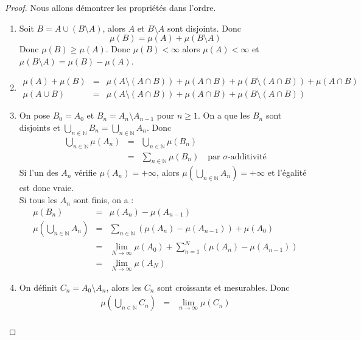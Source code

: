 \begin{proof}
	Nous allons démontrer les propriétés dans l'ordre.
	\begin{enumerate}
		\item Soit $B = A \cup (B \setminus A)$, alors $A$ et $B \setminus A$ sont disjoints. Donc
		      \[\mu(B) = \mu(A) + \mu(B \setminus A)\]
		      Donc $\mu(B) \geq \mu(A)$. Donc $\mu(B) < \infty$ alors $\mu(A)< \infty$ et $\mu(B \setminus A) = \mu(B) - \mu(A)$.
		\item \begin{eqnarray*}
			      \mu(A) + \mu (B) &=& \mu( A \setminus (A \cap B)) + \mu(A \cap B) + \mu(B \setminus (A \cap B)) + \mu(A \cap B) \\
			      \mu(A\cup B)&=& \mu(A \setminus (A \cap B)) + \mu(A \cap B) + \mu(B \setminus (A \cap B))
		      \end{eqnarray*}
		\item On pose $B_0 = A_0$ et $B_n = A_n \setminus A_{n-1}$ pour $n \geq 1$. On a que les $B_n$ sont disjoints et
		      $\bigcup\limits_{n \in \mathbb{N}} B_n = \bigcup\limits_{n \in \mathbb{N}} A_n$. Donc
		      \begin{eqnarray*}
			      \bigcup\limits_{n \in \mathbb{N}} \mu(A_n) &=& \bigcup\limits_{n \in \mathbb{N}} \mu(B_n) \\
			      &=& \sum\limits_{n \in \mathbb{N}} \mu(B_n) \quad \text{par } \sigma\text{-additivité}
		      \end{eqnarray*}
		      Si l'un des $A_n$ vérifie $\mu(A_n) = +\infty$, alors $\mu(\bigcup\limits_{n \in \mathbb{N}} A_n) = +\infty$
		      et l'égalité est donc vraie.
		      \\
		      Si tous les $A_n$ sont finis, on a :
		      \begin{eqnarray*}
			      \mu(B_n) &=& \mu(A_n) - \mu(A_{n-1}) \\
			      \mu(\bigcup\limits_{n \in \mathbb{N}} A_n) &=& \sum\limits_{n \in \mathbb{N}} \left( \mu(A_n) - \mu(A_{n-1}) \right)+ \mu(A_0) \\
			      &=& \lim\limits_{N \to \infty} \mu(A_0) + \sum\limits_{n = 1}^N \left( \mu(A_n) - \mu(A_{n-1}) \right) \\
			      &=& \lim\limits_{N \to \infty} \mu(A_N)
		      \end{eqnarray*}
		\item On définit $C_n = A_0 \setminus A_n $, alors les $C_n$ sont croissants et mesurables. Donc
		      \begin{eqnarray*}
			      \mu(\bigcup\limits_{n \in \mathbb{N}} C_n) &=& \lim\limits_{n \to \infty} \mu(C_n) \\

\end{eqnarray*}
\end{enumerate}
\end{proof}
